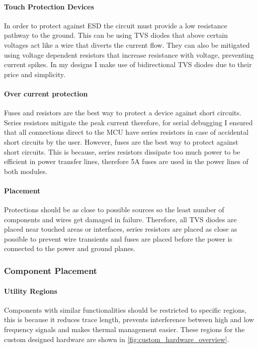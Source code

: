 \paragraph{Touch Protection Devices}
In order to protect against \gls{ESD} the circuit must provide a low resistance pathway to the ground. This can be using \gls{TVS} diodes that above certain voltages act like a wire that diverts the current flow. They can also be mitigated using voltage dependent resistors that increase resistance with voltage, preventing current spikes. In my designs I make use of bidirectional \gls{TVS} diodes due to their price and simplicity. 
\paragraph{Over current protection}
Fuses and resistors are the best way to protect a device against short circuits. Series resistors mitigate the peak current therefore, for serial debugging I ensured that all connections direct to the \gls{MCU} have series resistors in case of accidental short circuits by the user. However, fuses are the best way to protect against short circuits. This is because, series resistors dissipate too much power to be efficient in power transfer lines, therefore 5A fuses are used in the power lines of both modules. 
\paragraph{Placement}
Protections should be as close to possible sources so the least number of components and wires get damaged in failure. Therefore, all \gls{TVS} diodes are placed near touched areas or interfaces, series resistors are placed as close as possible to prevent wire transients and fuses are placed before the power is connected to the power and ground planes.

\subsubsection{Component Placement}
\paragraph{Utility Regions}
Components with similar functionalities should be restricted to specific regions, this is because it reduces trace length, prevents interference between high and low frequency signals and makes thermal management easier. These regions for the custom designed hardware are shown in \ref{fig:custom_hardware_overview}.
